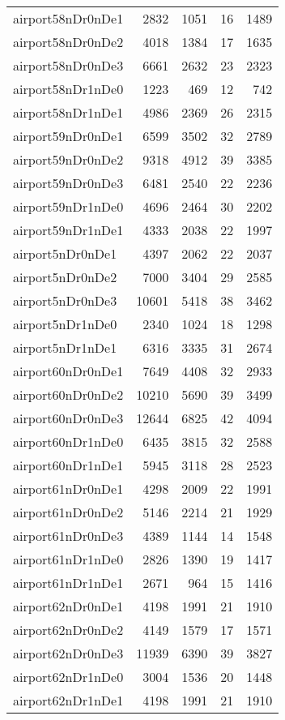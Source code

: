 \begin{longtable}{lrrrr}
airport58nDr0nDe1 & 2832 & 1051 & 16 & 1489 \\
airport58nDr0nDe2 & 4018 & 1384 & 17 & 1635 \\
airport58nDr0nDe3 & 6661 & 2632 & 23 & 2323 \\
airport58nDr1nDe0 & 1223 & 469 & 12 & 742 \\
airport58nDr1nDe1 & 4986 & 2369 & 26 & 2315 \\
airport59nDr0nDe1 & 6599 & 3502 & 32 & 2789 \\
airport59nDr0nDe2 & 9318 & 4912 & 39 & 3385 \\
airport59nDr0nDe3 & 6481 & 2540 & 22 & 2236 \\
airport59nDr1nDe0 & 4696 & 2464 & 30 & 2202 \\
airport59nDr1nDe1 & 4333 & 2038 & 22 & 1997 \\
airport5nDr0nDe1 & 4397 & 2062 & 22 & 2037 \\
airport5nDr0nDe2 & 7000 & 3404 & 29 & 2585 \\
airport5nDr0nDe3 & 10601 & 5418 & 38 & 3462 \\
airport5nDr1nDe0 & 2340 & 1024 & 18 & 1298 \\
airport5nDr1nDe1 & 6316 & 3335 & 31 & 2674 \\
airport60nDr0nDe1 & 7649 & 4408 & 32 & 2933 \\
airport60nDr0nDe2 & 10210 & 5690 & 39 & 3499 \\
airport60nDr0nDe3 & 12644 & 6825 & 42 & 4094 \\
airport60nDr1nDe0 & 6435 & 3815 & 32 & 2588 \\
airport60nDr1nDe1 & 5945 & 3118 & 28 & 2523 \\
airport61nDr0nDe1 & 4298 & 2009 & 22 & 1991 \\
airport61nDr0nDe2 & 5146 & 2214 & 21 & 1929 \\
airport61nDr0nDe3 & 4389 & 1144 & 14 & 1548 \\
airport61nDr1nDe0 & 2826 & 1390 & 19 & 1417 \\
airport61nDr1nDe1 & 2671 & 964 & 15 & 1416 \\
airport62nDr0nDe1 & 4198 & 1991 & 21 & 1910 \\
airport62nDr0nDe2 & 4149 & 1579 & 17 & 1571 \\
airport62nDr0nDe3 & 11939 & 6390 & 39 & 3827 \\
airport62nDr1nDe0 & 3004 & 1536 & 20 & 1448 \\
airport62nDr1nDe1 & 4198 & 1991 & 21 & 1910 \\

\end{longtable}
